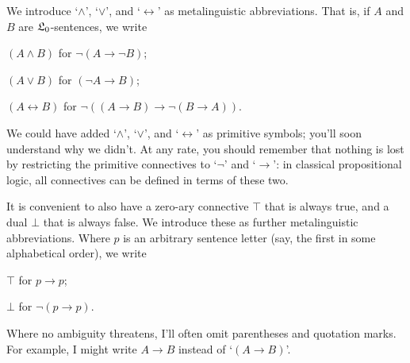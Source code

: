 



We introduce `$\land$', `$\lor$', and `$\leftrightarrow$' as metalinguistic abbreviations.
That is, if $A$ and $B$ are $\mathfrak{L}_{0}$-sentences, we write
%
\begin{itemize*}
\item $(A \land B)$ for $\neg(A \to \neg B)$;
\item $(A \lor B)$ for $(\neg A \to B)$;
\item $(A \leftrightarrow B)$ for $\neg ((A \to B) \to \neg(B \to A))$.
\end{itemize*}
%
We could have added `$\land$', `$\lor$', and `$\leftrightarrow$' as primitive symbols;
you'll soon understand why we didn't.
At any rate,
you should remember that
nothing is lost by restricting the primitive connectives to `$\neg$' and `$\to$':
in classical propositional logic,
all connectives can be defined in terms of these two.

It is convenient to also have a zero-ary connective $\top$ that is always true,
and a dual $\bot$ that is always false.
We introduce these as further metalinguistic abbreviations.
Where $p$ is an arbitrary sentence letter
(say, the first in some alphabetical order),
we write

\begin{itemize*}
\item $\top$ for $p \to p$;
\item $\bot$ for $\neg(p \to p)$.
\end{itemize*}

Where no ambiguity threatens, I'll often omit parentheses and quotation marks.
For example, I might write $A \to B$ instead of `$(A \to B)$'.


